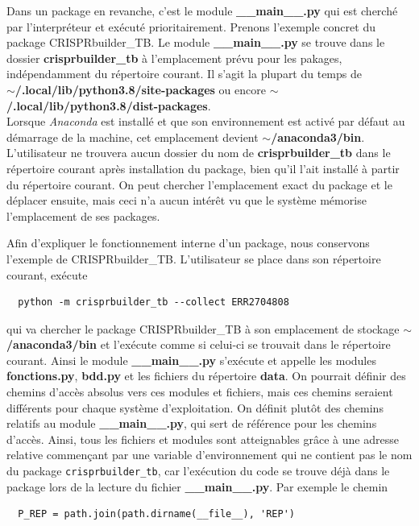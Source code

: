 \documentclass[twoside,a4paper,11pt,frenchb,openany]{report}
\begin{document}
Dans un package en revanche, c'est le module \textbf{\_\_main\_\_.py} qui est cherché par l'interpréteur et exécuté prioritairement. Prenons l'exemple concret du package CRISPRbuilder\_TB. Le module \textbf{\_\_main\_\_.py} se trouve dans le dossier \textbf{crisprbuilder\_tb} à l'emplacement prévu pour les pakages, indépendamment du répertoire courant. Il s'agit la plupart du temps de \\\textbf{$\sim$/.local/lib/python3.8/site-packages} ou encore \textbf{$\sim$/.local/lib/python3.8/dist-packages}. \\Lorsque \textit{Anaconda} est installé et que son environnement est activé par défaut au démarrage de la machine, cet emplacement devient \textbf{$\sim$/anaconda3/bin}. L'utilisateur ne trouvera aucun dossier du nom de \textbf{crisprbuilder\_tb} dans le répertoire courant après installation du package, bien qu'il l'ait installé à partir du répertoire courant. On peut chercher l'emplacement exact du package et le déplacer ensuite, mais ceci n'a aucun intérêt vu que le système mémorise l'emplacement de ses packages.

Afin d'expliquer le fonctionnement interne d'un package, nous conservons l'exemple de CRISPRbuilder\_TB. L'utilisateur se place dans son répertoire courant, exécute 

\begin{verbatim}
  python -m crisprbuilder_tb --collect ERR2704808
\end{verbatim}

qui va chercher le package CRISPRbuilder\_TB à son emplacement de stockage \textbf{$\sim$/anaconda3/bin} et l'exécute comme si celui-ci se trouvait dans le répertoire courant. Ainsi le module \textbf{\_\_main\_\_.py} s'exécute et appelle les modules \textbf{fonctions.py}, \textbf{bdd.py} et les fichiers du répertoire \textbf{data}. On pourrait définir des chemins d'accès absolus vers ces modules et fichiers, mais ces chemins seraient différents pour chaque système d'exploitation. On définit plutôt des chemins relatifs au module \textbf{\_\_main\_\_.py}, qui sert de référence pour les chemins d'accès. Ainsi, tous les fichiers et modules sont atteignables grâce à une adresse relative commençant par une variable d'environnement qui ne contient pas le nom du package \texttt{crisprbuilder\_tb}, car l'exécution du code se trouve déjà dans le package lors de la lecture du fichier \textbf{\_\_main\_\_.py}. Par exemple le chemin

\begin{verbatim}
  P_REP = path.join(path.dirname(__file__), 'REP')
\end{verbatim}
\end{document}
